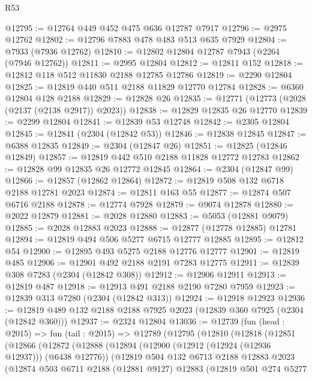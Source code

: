 \begin{lexlean}{R53}
\begin{coremodule}
@12795 := @12764 @449 @452 @475 @636 @12787 @7917
@12796 := @2975 @12762
@12802 := @12796 @7883 @478 @483 @513 @635 @7929
@12804 := @7933 (@7936 @12762)
@12810 := @12802 @12804 @12787 @7943 (@2264 (@7946 @12762))
@12811 := @2995 @12804
@12812 := @12811 @152
@12818 := @12812 @118 @512 @11830 @2188 @12785 @12786
@12819 := @2290 @12804
@12825 := @12819 @440 @511 @2188 @11829 @12770 @12784
@12828 := @6360 @12804 @128 @2188
@12829 := @12828 @26
@12835 := @12771 (@12773 (@2028 (@2137 (@2138 @2917)) @2023))
@12838 := @12829 @12835 @26 @12770
@12839 := @2299 @12804
@12841 := @12839 @53 @12748
@12842 := @2305 @12804
@12845 := @12841 (@2304 (@12842 @53))
@12846 := @12838 @12845
@12847 := @6388 @12835
@12849 := @2304 (@12847 @26)
@12851 := @12825 (@12846 @12849)
@12857 := @12819 @442 @510 @2188 @11828 @12772 @12783
@12862 := @12828 @99 @12835 @26 @12772 @12845
@12864 := @2304 (@12847 @99)
@12866 := @12857 (@12862 @12864)
@12872 := @12819 @508 @132 @6718 @2188 @12781 @2023
@12874 := @12811 @163 @55
@12877 := @12874 @507 @6716 @2188
@12878 := @12774 @7928
@12879 := @9074 @12878
@12880 := @2022 @12879
@12881 := @2028 @12880
@12883 := @5053 (@12881 @9079)
@12885 := @2028 @12883 @2023
@12888 := @12877 (@12778 @12885) @12781
@12894 := @12819 @494 @506 @5277 @6715 @12777 @12885
@12895 := @12812 @54
@12900 := @12895 @493 @5275 @2188 @12776 @12777
@12901 := @12819 @485
@12906 := @12901 @492 @2188 @2191 @7283 @12775
@12911 := @12839 @308 @7283 (@2304 (@12842 @308))
@12912 := @12906 @12911
@12913 := @12819 @487
@12918 := @12913 @491 @2188 @2190 @7280 @7959
@12923 := @12839 @313 @7280 (@2304 (@12842 @313))
@12924 := @12918 @12923
@12936 := @12819 @489 @132 @2188 @2188 @7925 @2023 (@12839 @360 @7925 (@2304 (@12842 @360)))
@12937 := @2324 @12804
@13036 := @12739
    (fun (head : @2015) =>
    fun (tail : @2015) =>
    @12789
      (@12795
        (@12810
          (@12818
            (@12851
              (@12866
                (@12872
                  (@12888
                    (@12894
                      (@12900 (@12912 (@12924 (@12936 @12937))) (@6438 @12776))
                      (@12819
                        @504
                        @132
                        @6713
                        @2188
                        @12883
                        @2023
                        (@12874
                          @503
                          @6711
                          @2188
                          (@12881 @9127)
                          @12883
                          (@12819
                            @501
                            @274
                            @5277

\end{coremodule}
\end{lexlean}
